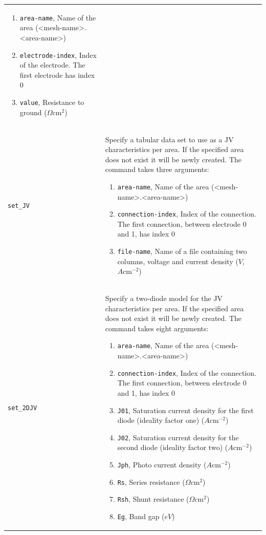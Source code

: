 \documentclass[noshowpacs,preprintnumbers,amsmath,amssymb, letter]{revtex4}
\begin{document}
\begin{longtable}{p{}p{}}
\begin{enumerate}
\item \texttt{area-name}, Name of the area (\textless mesh-name\textgreater .\textless area-name\textgreater )
\item \texttt{electrode-index}, Index of the electrode. The first electrode has index 0
\item \texttt{value}, Resistance to ground ($\Omega \text{cm}^2$)
\end{enumerate}\\
\texttt{set\_JV}	&  Specify a tabular data set to use as a JV characteristics per area. If the specified area does not exist it will be newly created. The command takes three arguments:
\begin{enumerate}
\item \texttt{area-name}, Name of the area (\textless mesh-name\textgreater .\textless area-name\textgreater )
\item \texttt{connection-index}, Index of the connection. The first connection, between electrode 0 and 1,  has index 0
\item \texttt{file-name}, Name of a file containing two columns, voltage and current density ($V$, $A \text{cm}^{-2}$)
\end{enumerate}\\
\texttt{set\_2DJV}	&  Specify a two-diode model for the JV characteristics per area. If the specified area does not exist it will be newly created. The command takes eight arguments:
\begin{enumerate}
\item \texttt{area-name}, Name of the area (\textless mesh-name\textgreater .\textless area-name\textgreater )
\item \texttt{connection-index}, Index of the connection. The first connection, between electrode 0 and 1,  has index 0
\item \texttt{J01}, Saturation current density for the first diode (ideality factor one)  ($A \text{cm}^{-2}$)
\item \texttt{J02}, Saturation current density for the second diode (ideality factor two)  ($A \text{cm}^{-2}$)
\item \texttt{Jph}, Photo current density ($A \text{cm}^{-2}$)
\item \texttt{Rs}, Series resistance ($\Omega \text{cm}^2$)
\item \texttt{Rsh}, Shunt resistance ($\Omega \text{cm}^2$)
\item \texttt{Eg}, Band gap ($eV$)
\end{enumerate}\\

\end{longtable}
\end{document}

